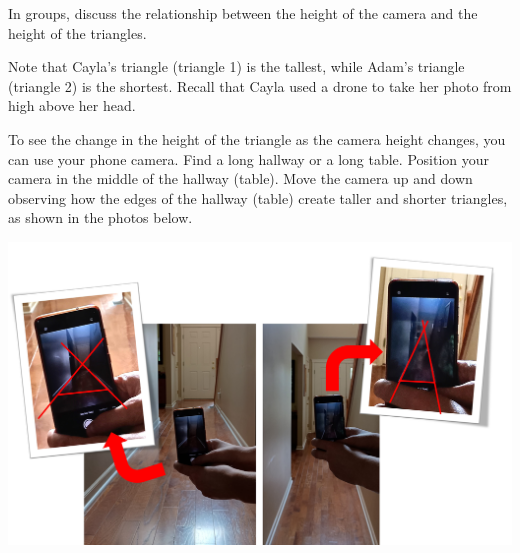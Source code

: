 \documentclass{ximera}
\begin{document}
\begin{exploration}
In groups, discuss the relationship between the height of the camera and the height of the triangles.

\begin{expandable}
    Note that Cayla's triangle (triangle 1) is the tallest, while Adam's triangle (triangle 2) is the shortest.  Recall that Cayla used a drone to take her photo from high above her head.  
\end{expandable}

To see the change in the height of the triangle as the camera height changes, you can use your phone camera.  Find a long hallway or a long table.  Position your camera in the middle of the hallway (table).  Move the camera up and down observing how the edges of the hallway (table) create taller and shorter triangles, as shown in the photos below.

\begin{image}
         \includegraphics[width=6in]{doItYourself.jpg}
\end{image}

\end{exploration}
\end{document}

